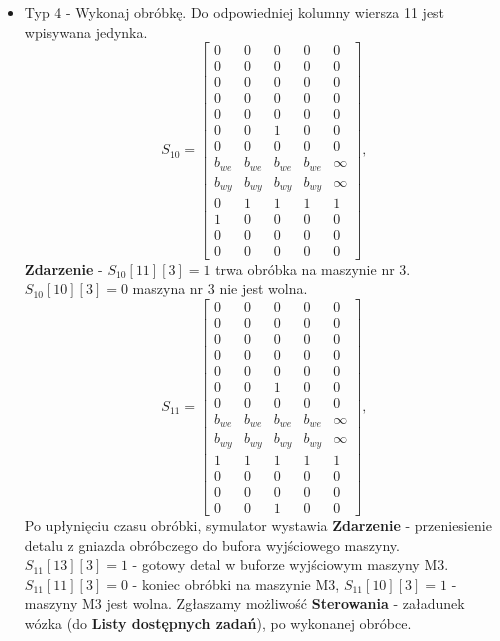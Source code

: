 \documentclass[10pt, a4paper]{article}
\begin{document}
\begin{itemize}
\item Typ 4 - Wykonaj obróbkę.
Do odpowiedniej kolumny wiersza 11 jest wpisywana jedynka.
\begin{equation*}
S_{10}=\left[\begin{array}{ccccc}
0 & 0 & 0 & 0&0\\
0 & 0 & 0 & 0 & 0\\
0 & 0 & 0 & 0& 0\\
0 & 0 & 0 & 0& 0\\
0 & 0 & 0 & 0& 0\\
0 & 0 & 1 & 0 & 0\\
0 & 0 & 0 & 0& 0\\
b_{we}& b_{we}& b_{we}& b_{we} & \infty\\
b_{wy}& b_{wy}& b_{wy}& b_{wy} & \infty\\
0 & 1& 1& 1 & 1\\
1 & 0 & 0 & 0 & 0\\
0 & 0 & 0 & 0 & 0\\
0 & 0 & 0 & 0 & 0
\end{array}\right],
\end{equation*}
\textbf{Zdarzenie} - $S_{10}[11][3]=1$ trwa obróbka na maszynie nr 3. $S_{10}[10][3]=0$ maszyna nr 3 nie jest wolna. 
\begin{equation*}
S_{11}=\left[\begin{array}{ccccc}
0 & 0 & 0 & 0&0\\
0 & 0 & 0 & 0 & 0\\
0 & 0 & 0 & 0& 0\\
0 & 0 & 0 & 0& 0\\
0 & 0 & 0 & 0& 0\\
0 & 0 & 1 & 0 & 0\\
0 & 0 & 0 & 0& 0\\
b_{we}& b_{we}& b_{we}& b_{we} & \infty\\
b_{wy}& b_{wy}& b_{wy}& b_{wy} & \infty\\
1 & 1& 1& 1 & 1\\
0 & 0 & 0 & 0 & 0\\
0 & 0 & 0 & 0 & 0\\
0 & 0 & 1 & 0 & 0
\end{array}\right],
\end{equation*}
Po upłynięciu czasu obróbki, symulator wystawia \textbf{Zdarzenie} - przeniesienie detalu z gniazda obróbczego do bufora wyjściowego maszyny. $S_{11}[13][3]=1$ - gotowy detal w buforze wyjściowym maszyny M3. $S_{11}[11][3]=0$ - koniec obróbki na maszynie M3, $S_{11}[10][3]=1$ - maszyny M3 jest wolna. Zgłaszamy możliwość \textbf{Sterowania} - załadunek wózka (do \textbf{Listy dostępnych zadań}), po wykonanej obróbce.
\end{itemize}
\end{document}
